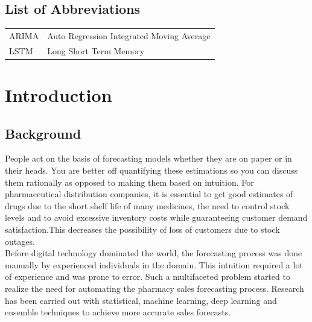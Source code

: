 \documentclass[12pt]{report}
\begin{document}
\newpage

\tableofcontents

\newpage

\listoffigures

\newpage

\listoftables

\newpage



\section*{List of Abbreviations}

\begin{tabular}{p{3cm} l}
	ARIMA	& Auto Regression Integrated Moving Average\\
	LSTM	& Long Short Term Memory\\	
	

\end{tabular}


\newpage

\chapter{Introduction}

\section{Background}


People act on the basis of forecasting models whether they are on paper or in their heads. You are better off quantifying these estimations so you can discuss them rationally as opposed to making them based on intuition. For pharmaceutical distribution companies, it is essential to get good estimates of drugs due to the short shelf life of many medicines, the need to control stock levels and to avoid excessive inventory costs while guaranteeing customer demand satisfaction.This decreases the possibility of loss of customers due to stock outages.\\

Before digital technology dominated the world, the forecasting process was done manually by experienced individuals in the domain. This intuition required a lot of experience and was prone to error. Such a multifaceted problem started to realize the need for automating the pharmacy sales forecasting process. Research has been carried out with statistical, machine learning, deep learning and ensemble techniques to achieve more accurate sales forecasts. \cite{Perera2019}\\
\end{document}
